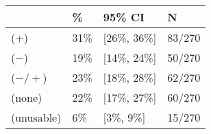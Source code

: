 \begin{tabular}{llll}
\hline
& \% & 95\% CI  & N \\
\hline
(+) & 31\% & [26\%, 36\%] & 83/270\\
($-$) & 19\% & [14\%, 24\%] & 50/270\\
($-/+$) & 23\% & [18\%, 28\%] & 62/270\\
(none) & 22\% & [17\%, 27\%] & 60/270\\
(unusable) & 6\% & [3\%, 9\%] & 15/270\\
\hline
\end{tabular}
